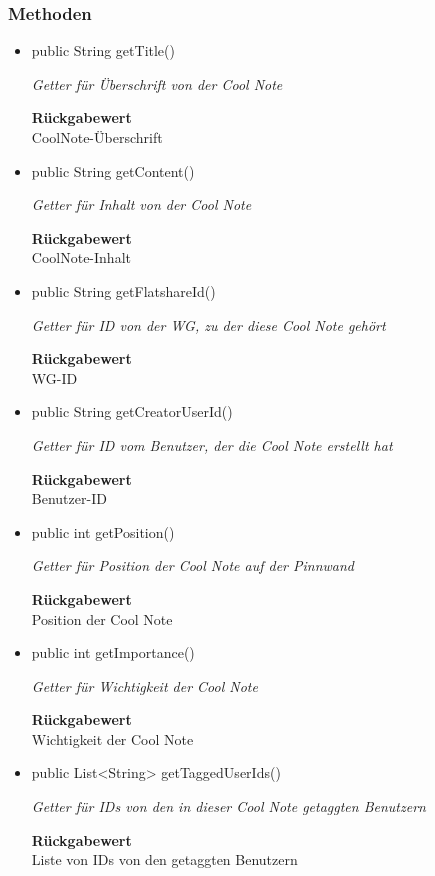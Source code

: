 \documentclass[a4paper]{scrreprt}
\begin{document}
    \subsubsection{Methoden}
    \begin{itemize}
    	\item{public String getTitle()}
    	
    	\textit{Getter für Überschrift von der Cool Note}
    	
    	
    	
    	\textbf{Rückgabewert} \\
    	CoolNote-Überschrift        \item{public String getContent()}
    	
    	\textit{Getter für Inhalt von der Cool Note}
    	
    	
    	
    	\textbf{Rückgabewert} \\
    	CoolNote-Inhalt        \item{public String getFlatshareId()}
    	
    	\textit{Getter für ID von der WG, zu der diese Cool Note gehört}
    	
    	
    	
    	\textbf{Rückgabewert} \\
    	WG-ID        \item{public String getCreatorUserId()}
    	
    	\textit{Getter für ID vom Benutzer, der die Cool Note erstellt hat}
    	
    	
    	
    	\textbf{Rückgabewert} \\
    	Benutzer-ID        \item{public int getPosition()}
    	
    	\textit{Getter für Position der Cool Note auf der Pinnwand}
    	
    	
    	
    	\textbf{Rückgabewert} \\
    	Position der Cool Note        \item{public int getImportance()}
    	
    	\textit{Getter für Wichtigkeit der Cool Note}
    	
    	
    	
    	\textbf{Rückgabewert} \\
    	Wichtigkeit der Cool Note        \item{public List<String> getTaggedUserIds()}
    	
    	\textit{Getter für IDs von den in dieser Cool Note getaggten Benutzern}
    	
    	
    	
    	\textbf{Rückgabewert} \\
    	Liste von IDs von den getaggten Benutzern
    \end{itemize}
\end{document}
